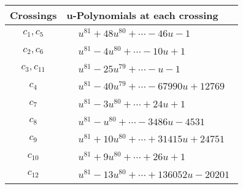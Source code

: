 \documentclass[1p]{elsarticle_modified}
\theoremstyle{definition}
\begin{document}
\begin{tabular}{m{50pt}|m{274pt}}
Crossings & \hspace{64pt}u-Polynomials at each crossing \\
\hline $$\begin{aligned}c_{1},c_{5}\end{aligned}$$&$\begin{aligned}
&u^{81}+48 u^{80}+\cdots-46 u-1
\end{aligned}$\\
\hline $$\begin{aligned}c_{2},c_{6}\end{aligned}$$&$\begin{aligned}
&u^{81}-4 u^{80}+\cdots-10 u+1
\end{aligned}$\\
\hline $$\begin{aligned}c_{3},c_{11}\end{aligned}$$&$\begin{aligned}
&u^{81}-25 u^{79}+\cdots- u-1
\end{aligned}$\\
\hline $$\begin{aligned}c_{4}\end{aligned}$$&$\begin{aligned}
&u^{81}-40 u^{79}+\cdots-67990 u+12769
\end{aligned}$\\
\hline $$\begin{aligned}c_{7}\end{aligned}$$&$\begin{aligned}
&u^{81}-3 u^{80}+\cdots+24 u+1
\end{aligned}$\\
\hline $$\begin{aligned}c_{8}\end{aligned}$$&$\begin{aligned}
&u^{81}- u^{80}+\cdots-3486 u-4531
\end{aligned}$\\
\hline $$\begin{aligned}c_{9}\end{aligned}$$&$\begin{aligned}
&u^{81}+10 u^{80}+\cdots+31415 u+24751
\end{aligned}$\\
\hline $$\begin{aligned}c_{10}\end{aligned}$$&$\begin{aligned}
&u^{81}+9 u^{80}+\cdots+26 u+1
\end{aligned}$\\
\hline $$\begin{aligned}c_{12}\end{aligned}$$&$\begin{aligned}
&u^{81}-13 u^{80}+\cdots+136052 u-20201
\end{aligned}$\\
\hline
\end{tabular}\\~\\
\end{document}
